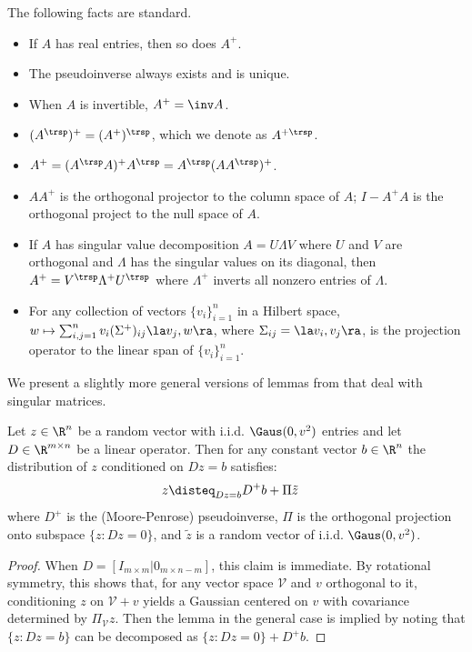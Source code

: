 \documentclass[main.tex]{subfiles}
\begin{document}
The following facts are standard.
\begin{itemize}
    \item If $A$ has real entries, then so does $A^+$.
    \item The pseudoinverse always exists and is unique.
    \item When $A$ is invertible, $A^+ = \inv A$.
    \item $(A^\trsp)^+ = (A^+)^\trsp$, which we denote as $A^{+\trsp}$.
    \item $A^+ = (A^\trsp A)^+ A^\trsp = A^\trsp (A A^\trsp)^+$.
    \item $AA^+$ is the orthogonal projector to the column space of $A$;
        $I - A^+ A$ is the orthogonal project to the null space of $A$.
    \item If $A$ has singular value decomposition $A = U\Lambda V$ where $U$ and $V$ are orthogonal and $\Lambda$ has the singular values on its diagonal, then $A^+ = V^\trsp \Lambda^+ U^\trsp$ where $\Lambda^+$ inverts all nonzero entries of $\Lambda$.
    \item For any collection of vectors $\{v_i\}_{i=1}^n$ in a Hilbert space, $w \mapsto \sum_{i,j=1}^n v_i (\Sigma^+)_{ij} \la v_j, w \ra $, where $\Sigma_{ij} = \la v_i, v_j \ra$, is the projection operator to the linear span of $\{v_i\}_{i=1}^n$.
\end{itemize}

We present a slightly more general versions of lemmas from \citet{bayati_dynamics_2011} that deal with singular matrices.
\begin{lemma}\label{lemma:condTrickVec}
Let $z \in \R^n$ be a random vector with i.i.d. $\Gaus(0, v^2)$ entries and let $D \in \R^{m\times n}$ be a linear operator.
Then for any constant vector $b \in \R^n$ the distribution of $z$ conditioned on $Dz = b$ satisfies:
\begin{align*}
    z
        &\disteq_{Dz = b}
            D^+ b + \Pi \tilde z
\end{align*}
where $D^+$ is the (Moore-Penrose) pseudoinverse, $\Pi$ is the orthogonal projection onto subspace $\{z: Dz = 0\}$, and $\tilde z$ is a random vector of i.i.d. $\Gaus(0, v^2)$.
\end{lemma}
\begin{proof}
When $D = [I_{m \times m} | 0_{m \times {n-m}}]$, this claim is immediate.
By rotational symmetry, this shows that, for any vector space $\mathcal V$ and $v$ orthogonal to it, conditioning $z$ on $\mathcal V + v$ yields a Gaussian centered on $v$ with covariance determined by $\Pi_{\mathcal V} z$.
Then the lemma in the general case is implied by noting that $\{z: Dz = b\}$ can be decomposed as $\{z: Dz = 0 \} + D^+ b$.
\end{proof}
\end{document}
